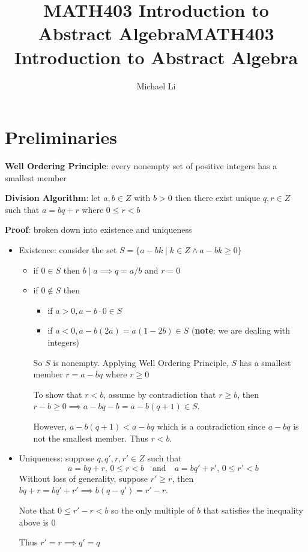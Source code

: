 \documentclass{article}
\date{}
\title{MATH403 Introduction to Abstract Algebra}
\begin{document}
 
  \author{Michael Li}
  \title{MATH403 Introduction to Abstract Algebra}
  \maketitle
  \tableofcontents
  \newpage
  \section{Preliminaries}
  \textbf{Well Ordering Principle}: every nonempty set of positive integers has a smallest member

  \bigskip
  
  \textbf{Division Algorithm}: let $a, b \in Z$ with $b > 0$ then there exist unique $q, r \in Z$ such that $a = bq + r$ where $0 \leq r < b$

  \textbf{Proof}: broken down into existence and uniqueness
  \begin{itemize}
    \item Existence: consider the set $S = \{a - bk \mid k \in Z \wedge a - bk \geq 0\}$
      \begin{itemize}
        \item if $0 \in S$ then $b \mid a \implies q = a/b$ and $r = 0$
        \item if $0 \notin S$ then
          \begin{itemize}
            \item if $a > 0, a - b \cdot 0 \in S$
            \item if $a < 0, a - b(2a) = a(1 - 2b) \in S$ (\textbf{note}: we are dealing with integers)
          \end{itemize}
          So $S$ is nonempty. Applying Well Ordering Principle, $S$ has a smallest member $r = a - bq$ where $r \geq 0$

          To show that $r < b$, assume by contradiction that $r \geq b$, then $r - b \geq 0 \implies a - bq -b = a - b(q + 1) \in S$. 

          However, $a - b(q+1) < a - bq$ which is a contradiction since $a - bq$ is not the smallest member. Thus $r < b$.
      \end{itemize}
    \item Uniqueness: suppose $q, q', r, r' \in Z$ such that
      \[a = bq + r, \, 0 \leq r < b \quad \text{and} \quad a = bq' + r', \, 0 \leq r' < b\]
      Without loss of generality, suppose $r' \geq r$, then $bq + r = bq' + r' \implies b(q - q') = r' - r$. 

      Note that $0 \leq r' - r < b$ so the only multiple of $b$ that satisfies the inequality above is $0$

      Thus $r' = r \implies q' = q$
  \end{itemize}
\end{document}
